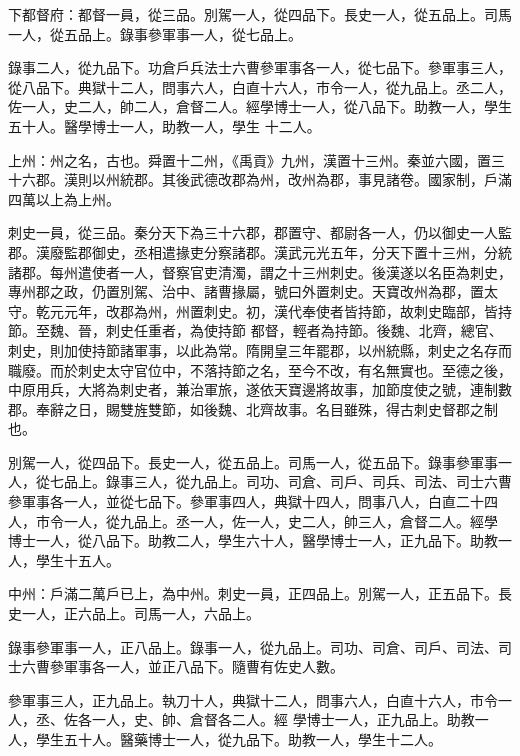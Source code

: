 \begin{pinyinscope}
 下都督府：都督一員，從三品。別駕一人，從四品下。長史一人，從五品上。司馬一人，從五品上。錄事參軍事一人，從七品上。



 錄事二人，從九品下。功倉戶兵法士六曹參軍事各一人，從七品下。參軍事三人，從八品下。典獄十二人，問事六人，白直十六人，市令一人，從九品上。丞二人，佐一人，史二人，帥二人，倉督二人。經學博士一人，從八品下。助教一人，學生五十人。醫學博士一人，助教一人，學生
 十二人。



 上州：州之名，古也。舜置十二州，《禹貢》九州，漢置十三州。秦並六國，置三十六郡。漢則以州統郡。其後武德改郡為州，改州為郡，事見諸卷。國家制，戶滿四萬以上為上州。



 刺史一員，從三品。秦分天下為三十六郡，郡置守、都尉各一人，仍以御史一人監郡。漢廢監郡御史，丞相遣掾吏分察諸郡。漢武元光五年，分天下置十三州，分統諸郡。每州遣使者一人，督察官吏清濁，謂之十三州刺史。後漢遂以名臣為刺史，專州郡之政，仍置別駕、治中、諸曹掾屬，號曰外置刺史。天寶改州為郡，置太守。乾元元年，改郡為州，州置刺史。初，漢代奉使者皆持節，故刺史臨部，皆持節。至魏、晉，刺史任重者，為使持節
 都督，輕者為持節。後魏、北齊，總官、刺史，則加使持節諸軍事，以此為常。隋開皇三年罷郡，以州統縣，刺史之名存而職廢。而於刺史太守官位中，不落持節之名，至今不改，有名無實也。至德之後，中原用兵，大將為刺史者，兼治軍旅，遂依天寶邊將故事，加節度使之號，連制數郡。奉辭之日，賜雙旌雙節，如後魏、北齊故事。名目雖殊，得古刺史督郡之制也。



 別駕一人，從四品下。長史一人，從五品上。司馬一人，從五品下。錄事參軍事一人，從七品上。錄事三人，從九品上。司功、司倉、司戶、司兵、司法、司士六曹參軍事各一人，並從七品下。參軍事四人，典獄十四人，問事八人，白直二十四人，市令一人，從九品上。丞一人，佐一人，史二人，帥三人，倉督二人。經學
 博士一人，從八品下。助教二人，學生六十人，醫學博士一人，正九品下。助教一人，學生十五人。



 中州：戶滿二萬戶已上，為中州。刺史一員，正四品上。別駕一人，正五品下。長史一人，正六品上。司馬一人，六品上。



 錄事參軍事一人，正八品上。錄事一人，從九品上。司功、司倉、司戶、司法、司士六曹參軍事各一人，並正八品下。隨曹有佐史人數。



 參軍事三人，正九品上。執刀十人，典獄十二人，問事六人，白直十六人，市令一人，丞、佐各一人，史、帥、倉督各二人。經
 學博士一人，正九品上。助教一人，學生五十人。醫藥博士一人，從九品下。助教一人，學生十二人。




\end{pinyinscope}
